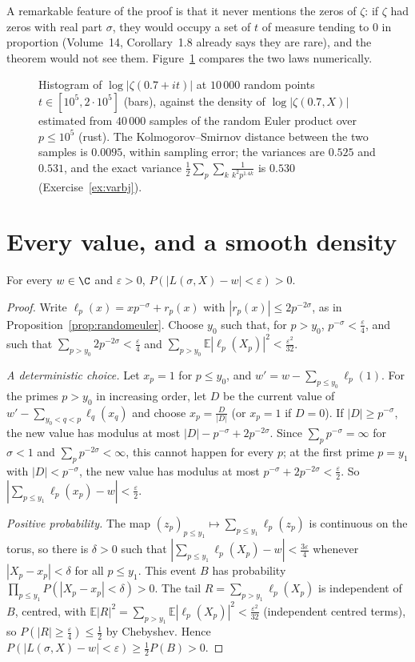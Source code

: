 A remarkable feature of the proof is that it never mentions the zeros of $\zeta$: if $\zeta$ had zeros with real part $\sigma$, they would occupy a set of $t$ of measure tending to $0$ in proportion (Volume~14, Corollary~1.8 already says they are rare), and the theorem would not see them. Figure~\ref{fig:bohrjessen} compares the two laws numerically.

\begin{figure}[ht]
\centering{}
\caption{Histogram of $\log|\zeta(0.7+it)|$ at $10\,000$ random points $t\in[10^5,2\cdot10^5]$ (bars), against the density of $\log|\zeta(0.7,X)|$ estimated from $40\,000$ samples of the random Euler product over $p\le10^5$ (rust). The Kolmogorov--Smirnov distance between the two samples is $0.0095$, within sampling error; the variances are $0.525$ and $0.531$, and the exact variance $\frac12\sum_p\sum_k\frac1{k^2p^{1.4k}}$ is $0.530$ (Exercise~\ref{ex:varbj}).}
\label{fig:bohrjessen}
\end{figure}

\section{Every value, and a smooth density}

\begin{lemma}\label{lem:support}
For every $w\in\C$ and $\varepsilon>0$, $P(|L(\sigma,X)-w|<\varepsilon)>0$.
\end{lemma}
\begin{proof}
Write $\ell_p(x)=xp^{-\sigma}+r_p(x)$ with $|r_p(x)|\le2p^{-2\sigma}$, as in Proposition~\ref{prop:randomeuler}. Choose $y_0$ such that, for $p>y_0$, $p^{-\sigma}<\frac\varepsilon4$, and such that $\sum_{p>y_0}2p^{-2\sigma}<\frac\varepsilon4$ and $\sum_{p>y_0}\mathbb E|\ell_p(X_p)|^2<\frac{\varepsilon^2}{32}$.

\emph{A deterministic choice.} Let $x_p=1$ for $p\le y_0$, and $w'=w-\sum_{p\le y_0}\ell_p(1)$. For the primes $p>y_0$ in increasing order, let $D$ be the current value of $w'-\sum_{y_0<q<p}\ell_q(x_q)$ and choose $x_p=\frac D{|D|}$ (or $x_p=1$ if $D=0$). If $|D|\ge p^{-\sigma}$, the new value has modulus at most $|D|-p^{-\sigma}+2p^{-2\sigma}$. Since $\sum_pp^{-\sigma}=\infty$ for $\sigma<1$ and $\sum_pp^{-2\sigma}<\infty$, this cannot happen for every $p$; at the first prime $p=y_1$ with $|D|<p^{-\sigma}$, the new value has modulus at most $p^{-\sigma}+2p^{-2\sigma}<\frac\varepsilon2$. So $|\sum_{p\le y_1}\ell_p(x_p)-w|<\frac\varepsilon2$.

\emph{Positive probability.} The map $(z_p)_{p\le y_1}\mapsto\sum_{p\le y_1}\ell_p(z_p)$ is continuous on the torus, so there is $\delta>0$ such that $|\sum_{p\le y_1}\ell_p(X_p)-w|<\frac{3\varepsilon}4$ whenever $|X_p-x_p|<\delta$ for all $p\le y_1$. This event $B$ has probability $\prod_{p\le y_1}P(|X_p-x_p|<\delta)>0$. The tail $R=\sum_{p>y_1}\ell_p(X_p)$ is independent of $B$, centred, with $\mathbb E|R|^2=\sum_{p>y_1}\mathbb E|\ell_p(X_p)|^2<\frac{\varepsilon^2}{32}$ (independent centred terms), so $P(|R|\ge\frac\varepsilon4)\le\frac12$ by Chebyshev. Hence $P(|L(\sigma,X)-w|<\varepsilon)\ge\frac12P(B)>0$.
\end{proof}

